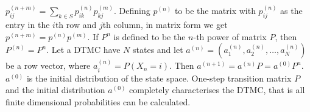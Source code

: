  $p^{(n+m)}_{ij} = \sum_{k \in S}p^{(n)}_{ik}p^{(m)}_{kj}$. Defining $p^(n)$ to be the matrix with $p^{(n)}_{ij}$ as the entry in the $i$th row and $j$th column, in matrix form we get $p^{(n+m)} = p^{(n)}p^{(m)}.$
 If $P^n$ is defined to be the $n$-th power of matrix $P$, then $P^{(n)} = P^n$.
 Let a DTMC have $N$ states and let $a^{(n)} = (a^{(n)}_1, a^{(n)}_2, \ldots, a^{(n)}_N)$ be a row vector, where $a^{(n)}_i = P(X_n = i)$. Then $a^{(n+1)} = a^{(n)}P = a^{(0)}P^n$. $a^{(0)}$ is the initial distribution of the state space.
 One-step transition matrix $P$ and the initial distribution $a^{(0)}$ completely characterises the DTMC, that is all finite dimensional probabilities can be calculated.